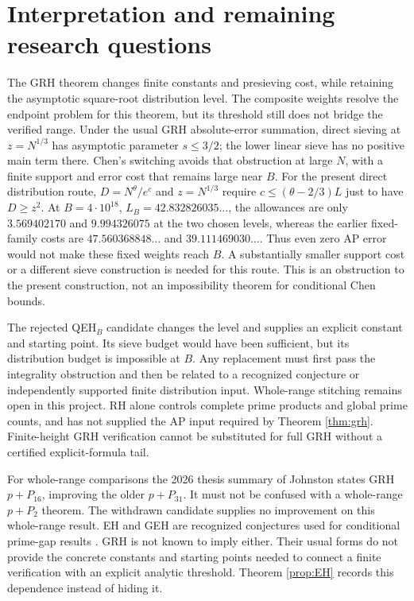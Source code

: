 \documentclass[11pt]{article}
\begin{document}
\section{Interpretation and remaining research questions}
The GRH theorem changes finite constants and presieving cost,
while retaining the asymptotic square-root distribution level.
The composite weights resolve the endpoint problem for this theorem,
but its threshold still does not bridge the verified range.
Under the usual GRH absolute-error summation,
direct sieving at $z=N^{1/3}$ has asymptotic parameter $s\le3/2$;
the lower linear sieve has no positive main term there.
Chen's switching avoids that obstruction at large $N$, with a
finite support and error cost that remains large near $B$.
For the present direct distribution route, $D=N^\theta/e^c$ and
$z=N^{1/3}$ require $c\le(\theta-2/3)L$ just to have $D\ge z^2$.
At $B=4\cdot10^{18}$, $L_B=42.832826035\ldots$, the allowances are
only $3.569402170$ and $9.994326075$ at the two chosen levels, whereas
the earlier fixed-family costs are $47.560368848\ldots$ and $39.111469030\ldots$.
Thus even zero AP error would not make these fixed weights reach $B$.
A substantially smaller support cost or a different sieve construction
is needed for this route. This is an obstruction to the present
construction, not an impossibility theorem for conditional Chen bounds.

The rejected QEH$_B$ candidate changes the level and supplies an
explicit constant and starting point. Its sieve budget would have
been sufficient, but its distribution budget is impossible at $B$.
Any replacement must first pass the integrality obstruction and then
be related to a recognized conjecture or independently supported finite
distribution input. Whole-range stitching remains open in this project.
RH alone controls complete prime products and global prime counts,
and has not supplied the AP input required by Theorem \ref{thm:grh}.
Finite-height GRH verification cannot be substituted for full GRH
without a certified explicit-formula tail.

For whole-range comparisons the 2026 thesis summary of Johnston
\cite{Jthesis} states GRH $p+P_{16}$, improving the older $p+P_{31}$.
It must not be confused with a whole-range $p+P_2$ theorem.
The withdrawn candidate supplies no improvement on this whole-range result.
EH and GEH are recognized conjectures used for conditional prime-gap
results \cite{Polymath}. GRH is not known to imply either. Their usual
forms do not provide the concrete constants and starting points needed
to connect a finite verification with an explicit analytic threshold.
Theorem \ref{prop:EH} records this dependence instead of hiding it.
\end{document}
